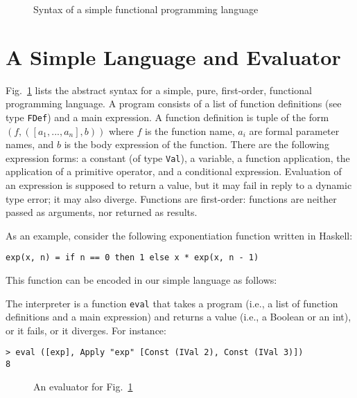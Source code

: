 \documentclass{eptcs}
\begin{document}
\begin{figure}
     \caption{Syntax of a simple functional programming language}
\label{F:syntax}
\end{figure}


\section{A Simple Language and Evaluator}

Fig.~\ref{F:syntax} lists the abstract syntax for a simple, pure,
first-order, functional programming language. A program consists of a list of function definitions (see type
\lstinline{FDef}) and a main expression. A function definition is
tuple of the form $(f, ([a_1, ..., a_n], b))$ where $f$ is the function
name, $a_i$ are formal parameter names, and $b$ is the body expression
of the function. There are the following expression forms: a constant
(of type \lstinline{Val}), a variable, a function application, the
application of a primitive operator, and a conditional
expression. Evaluation of an expression is supposed to return a value,
but it may fail in reply to a dynamic type error; it may also diverge.
Functions are first-order: functions are neither passed as arguments,
nor returned as results.

As an example, consider the following exponentiation function written in Haskell:

\begin{lstlisting}
exp(x, n) = if n == 0 then 1 else x * exp(x, n - 1)
\end{lstlisting}

\noindent
This function can be encoded in our simple language as follows:

 

\noindent
The interpreter is a function \lstinline{eval} that takes a 
program (i.e., a list of function definitions and a main expression)
and returns a value (i.e., a Boolean or an int), or it fails, or it
diverges. For instance:

\begin{lstlisting}
> eval ([exp], Apply "exp" [Const (IVal 2), Const (IVal 3)])
8
\end{lstlisting}

\begin{figure}
   \caption{An evaluator for Fig.~\ref{F:syntax}}
\label{F:Eval}
\end{figure}
\end{document}
